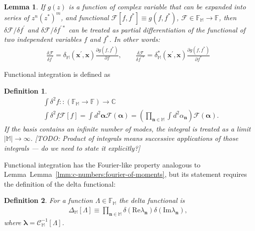 \documentclass[12pt,aip,jmp,amssymb,amsmath]{revtex4-1}
\newtheorem{definition}{Definition}
\newtheorem{lemma}{Lemma}
\begin{document}
\begin{lemma}
    If $g(z)$ is a function of complex variable that can be expanded into series of $z^n (z^*)^m$, and functional $\mathcal{F}[f, f^*] \equiv g(f, f^*)$, $\mathcal{F} \in \mathbb{F}_{\mathbb{M}} \rightarrow \mathbb{F}$, then $\delta \mathcal{F} / \delta f^\prime$ and $\delta \mathcal{F} / \delta f^{\prime*}$ can be treated as partial differentiation of the functional of two independent variables $f$ and $f^*$.
    In other words:
    \begin{equation*}\begin{split}
        \frac{\delta \mathcal{F}}{\delta f^\prime}
        = \delta_{\mathbb{M}}(\boldsymbol{x}^\prime, \boldsymbol{x})
            \frac{\partial g(f, f^*)}{\partial f},
        \qquad
        \frac{\delta \mathcal{F}}{\delta f^{\prime*}}
        = \delta_{\mathbb{M}}^*(\boldsymbol{x}^\prime, \boldsymbol{x})
            \frac{\partial g(f, f^*)}{\partial f^*}
    \end{split}\end{equation*}
\end{lemma}

Functional integration is defined as

\begin{definition}
    \begin{equation*}\begin{split}
        & \int \delta^2 f :: (\mathbb{F}_{\mathbb{M}} \rightarrow \mathbb{F}) \rightarrow \mathbb{C} \\
        & \int \delta^2 f \mathcal{F}[f]
        = \int d^2\boldsymbol{\alpha} \mathcal{F}(\boldsymbol{\alpha})
        = \left(
            \prod_{\boldsymbol{n} \in \mathbb{M}} \int d^2\alpha_{\boldsymbol{n}}
        \right) \mathcal{F}(\boldsymbol{\alpha}).
    \end{split}\end{equation*}
    If the basis contains an infinite number of modes, the integral is treated as a limit $|\mathbb{M}| \rightarrow \infty$.
    [TODO: Product of integrals means successive applications of those integrals --- do we need to state it explicitly?]
\end{definition}

Functional integration has the Fourier-like property analogous to Lemma~Lemma~\ref{lmm:c-numbers:fourier-of-moments}, but its statement requires the definition of the delta functional:

\begin{definition}
\label{def:func-calculus:delta-functional}
    For a function $\Lambda \in \mathbb{F}_{\mathbb{M}}$ the delta functional is
    \begin{equation*}\begin{split}
        \Delta_{\mathbb{M}}[\Lambda]
        \equiv \prod_{\boldsymbol{n} \in \mathbb{M}} \delta(\mathrm{Re} \lambda_{\boldsymbol{n}}) \delta(\mathrm{Im} \lambda_{\boldsymbol{n}}),
    \end{split}\end{equation*}
    where $\boldsymbol{\lambda} = \mathcal{C}_{\mathbb{M}}^{-1}[\Lambda]$.
\end{definition}
\end{document}
